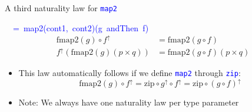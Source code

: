 \documentclass[english]{beamer}
\newenvironment{lyxcode}
   {\par\begin{list}{}{
     \setlength{\rightmargin}{\leftmargin}
     \setlength{\listparindent}{0pt}%
     \raggedright
     \setlength{\itemsep}{0pt}
     \setlength{\parsep}{0pt}
     \normalfont\ttfamily}%
    \def\{{\char`\{}
    \def\}{\char`\}}
    \def\textasciitilde{\char`\~}
    \item[]}
   {\end{list}}
\begin{document}
\begin{frame}{A third naturality law for \texttt{\textcolor{blue}{\footnotesize{}map2}} }
\begin{lyxcode}
\textcolor{blue}{\footnotesize{}~~=~map2(cont1,~cont2)(g~andThen~f)}{\footnotesize{}
\begin{align*}
\text{fmap}2\left(g\right)\circ f^{\uparrow} & =\text{fmap2}\left(g\circ f\right)\\
f^{\uparrow}\left(\text{fmap}2\left(g\right)\left(p\times q\right)\right) & =\text{fmap2}\left(g\circ f\right)\left(p\times q\right)
\end{align*}
}{\footnotesize \par}
\end{lyxcode}
\begin{itemize}
\item This law automatically follows if we define \texttt{\textcolor{blue}{\footnotesize{}map2}}
through \texttt{\textcolor{blue}{\footnotesize{}zip}}:{\footnotesize{}
\[
\text{fmap}2\left(g\right)\circ f^{\uparrow}=\text{zip}\circ g^{\uparrow}\circ f^{\uparrow}=\text{zip}\circ\left(g\circ f\right)^{\uparrow}
\]
}{\footnotesize \par}
\item Note: We always have one naturality law per type parameter
\end{itemize}
\end{frame}
\end{document}
